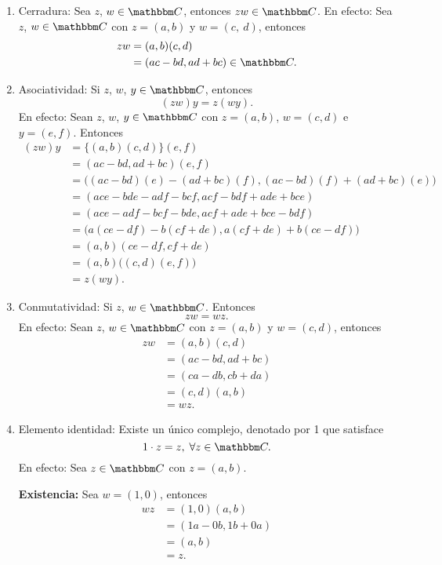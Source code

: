 \begin{enumerate}[resume,label=A\arabic*.]
    \item Cerradura: Sea $z$, $w \in \CC$, entonces $zw \in \CC$. En efecto: Sea $z$, $w \in \CC$ con $z=(a,  b)$ y $w=(c, \ d)$, entonces
    \begin{align*}
        zw & = (a,  b) (c,  d) \\
        & = (ac-bd,  ad+bc) \in \CC.
    \end{align*}
    \item Asociatividad: Si $z$, $w$, $y \in \CC$, entonces
    $$(zw)y=z(wy).$$
    En efecto: Sean $z$, $w$, $y \in \CC$ con $z=(a,  b)$, $w=(c,  d)$ e $y=(e,  f)$. Entonces
    \begin{align*}
        (zw)y &=\{ (a,  b)(c,  d) \} (e,  f) \\
        &=(ac-bd,  ad+bc)(e,  f) \\
        &=\big( (ac-bd)(e)-(ad+bc)(f),  (ac-bd)(f)+(ad+bc)(e) \big) \\
        &=(ace-bde-adf-bcf,  acf-bdf+ade+bce) \\
        &=(ace-adf-bcf-bde,  acf+ade+bce-bdf) \\
        &=\big( a(ce-df)-b(cf+de),  a(cf+de)+b(ce-df) \big) \\
        &=(a,  b)(ce-df,  cf+de) \\
        &=(a,  b)\big( (c,  d)(e,  f) \big) \\
        &=z(wy).
    \end{align*}
    \item Conmutatividad: Si $z$, $w \in \CC$. Entonces
    $$zw=wz.$$
    En efecto: Sean $z$, $w \in \CC$ con $z=(a,  b)$ y $w=(c,  d)$, entonces
    \begin{align*}
        zw &=(a,  b)(c,  d) \\
        &=(ac-bd,  ad+bc) \\
        &=(ca-db,  cb+da) \\
        &=(c,  d)(a,  b) \\
        &=wz.
    \end{align*}
    \item Elemento identidad: Existe un único complejo, denotado por 1 que satisface
    $$1 \cdot z=z, \; \forall z \in \CC.$$
    En efecto: Sea $z \in \CC$ con $z=(a,  b)$.
    
    \textbf{Existencia:} Sea $w=(1,  0)$, entonces
    \begin{align*}
        wz & = (1,  0)(a,  b) \\
        & = (1a-0b,  1b+0a) \\
        & = (a,  b) \\
        & = z.
    \end{align*}
    

\end{enumerate}
